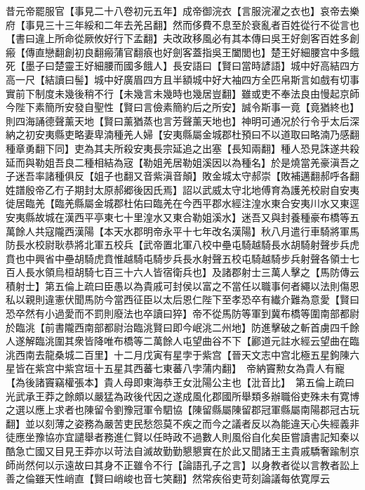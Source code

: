 昔元帝罷服官【事見二十八卷初元五年】成帝御浣衣【言服浣濯之衣也】哀帝去樂府【事見三十三年綏和二年去羌呂翻】然而侈費不息至於衰亂者百姓從行不從言也【書曰違上所命從厥攸好行下孟翻】夫改政移風必有其本傳曰吳王好劍客百姓多創瘢【傳直戀翻創初良翻瘢蒲官翻㾗也好劍客蓋指吳王闔閭也】楚王好細腰宫中多餓死【墨子曰楚靈王好細腰而國多餓人】長安語曰【賢曰當時諺語】城中好高結四方高一尺【結讀曰髻】城中好廣眉四方且半額城中好大袖四方全匹帛斯言如戲有切事實前下制度未幾後稍不行【未幾言未幾時也幾居豈翻】雖或吏不奉法良由慢起京師今陛下素簡所安發自聖性【賢曰言儉素簡約后之所安】誠令斯事一竟【竟猶終也】則四海誦德聲薰天地【賢曰薰猶蒸也言芳聲薰天地也】神明可通况於行令乎太后深納之初安夷縣吏略妻卑湳種羌人婦【安夷縣屬金城郡杜預曰不以道取曰略湳乃感翻種章勇翻下同】吏為其夫所殺安夷長宗延追之出塞【長知兩翻】種人恐見誅遂共殺延而與勒姐吾良二種相結為宼【勒姐羌居勒姐溪因以為種名】於是燒當羌豪滇吾之子迷吾率諸種俱反【姐子也翻又音紫滇音顛】敗金城太守郝崇【敗補邁翻郝呼各翻姓譜殷帝乙冇子期封太原郝郷後因氏焉】詔以武威太守北地傅育為護羌校尉自安夷徙居臨羌【臨羌縣屬金城郡杜佑曰臨羌在今西平郡水經注湟水東合安夷川水又東逕安夷縣故城在漢西平亭東七十里湟水又東合勒姐溪水】迷吾又與封養種豪布橋等五萬餘人共寇隴西漢陽【本天水郡明帝永平十七年改名漢陽】秋八月遣行車騎將軍馬防長水校尉耿恭將北軍五校兵【武帝置北軍八校中壘屯騎越騎長水胡騎射聲步兵虎賁也中興省中壘胡騎虎賁惟越騎屯騎步兵長水射聲五校屯騎越騎步兵射聲各領士七百人長水領烏桓胡騎七百三十六人皆宿衛兵也】及諸郡射士三萬人擊之【馬防傳云積射士】第五倫上疏曰臣愚以為貴戚可封侯以富之不當任以職事何者繩以法則傷恩私以親則違憲伏聞馬防今當西征臣以太后恩仁陛下至孝恐卒有纎介難為意愛【賢曰恐卒然有小過愛而不罰則廢法也卒讀曰猝】帝不從馬防等軍到冀布橋等圍南部都尉於臨洮【前書隴西南部都尉治臨洮賢曰即今岷洮二州地】防進擊破之斬首虜四千餘人遂解臨洮圍其衆皆降唯布橋等二萬餘人屯望曲谷不下【酈道元註水經云望曲在臨洮西南去龍桑城二百里】十二月戊寅有星孛于紫宫【晉天文志中宫北極五星鉤陳六星皆在紫宫中紫宫垣十五星其西蕃七東蕃八孛蒲内翻】　帝納竇勲女為貴人有寵【為後諸竇竊權張本】貴人母即東海恭王女沘陽公主也【沘音比】　第五倫上疏曰光武承王莽之餘頗以嚴猛為政後代因之遂成風化郡國所舉類多辦職俗吏殊未有寛博之選以應上求者也陳留令劉豫冠軍令駟協【陳留縣屬陳留郡冠軍縣屬南陽郡冠古玩翻】並以刻薄之姿務為嚴苦吏民愁怨莫不疾之而今之議者反以為能違天心失經義非徒應坐豫協亦宜譴舉者務進仁賢以任時政不過數人則風俗自化矣臣嘗讀書記知秦以酷急亡國又目見王莽亦以苛法自滅故勤勤懇懇實在於此又聞諸王主貴戚驕奢踰制京師尚然何以示遠故曰其身不正雖令不行【論語孔子之言】以身教者從以言教者訟上善之倫雖天性峭直【賢曰峭峻也音七笑翻】然常疾俗吏苛刻論議每依寛厚云

